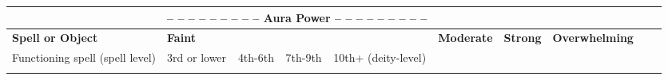 \begin{longtable}{llllllllll}
\hline
\multicolumn{1}{|p{1.448in}|}{\begin{minipage}[t]{1.448in}\raggedright
\textbf{} \end{minipage}} & \multicolumn{4}{p{2.775in}|}{\begin{minipage}[t]{2.775in}\centering
 --  --  --  --  --  --  --  --  -- \textbf{ Aura Power  --  --  --  --  --  --  --  --  -- }\end{minipage}}\\
\hline
\multicolumn{1}{p{0.055in}|}{\begin{minipage}[t]{0.055in}\centering
\textbf{Spell or Object}\end{minipage}} & \multicolumn{4}{p{0.222in}|}{\begin{minipage}[t]{0.222in}\centering
\textbf{Faint}\end{minipage}} & \multicolumn{1}{|p{1.448in}|}{\begin{minipage}[t]{1.448in}\centering
\textbf{Moderate}\end{minipage}} & \multicolumn{1}{p{0.668in}|}{\begin{minipage}[t]{0.668in}\centering
\textbf{Strong}\end{minipage}} & \multicolumn{1}{p{0.582in}|}{\begin{minipage}[t]{0.582in}\centering
\textbf{Overwhelming}\end{minipage}}\\
\hline
\multicolumn{1}{p{0.570in}|}{\begin{minipage}[t]{0.570in}\centering
Functioning spell (spell level)\end{minipage}} & \multicolumn{1}{p{0.955in}|}{\begin{minipage}[t]{0.955in}\centering
3rd or lower\end{minipage}} & \multicolumn{1}{p{0.055in}|}{\begin{minipage}[t]{0.055in}\centering
4th-6th\end{minipage}} & \multicolumn{1}{p{0.055in}|}{\begin{minipage}[t]{0.055in}\centering
7th-9th\end{minipage}} & \multicolumn{1}{p{0.055in}|}{\begin{minipage}[t]{0.055in}\centering
10th+ (deity-level)\end{minipage}}\\
\hline
\multicolumn{1}{p{0.055in}|}{\begin{minipage}[t]{0.055in}\centering

\end{minipage}}
\end{longtable}
